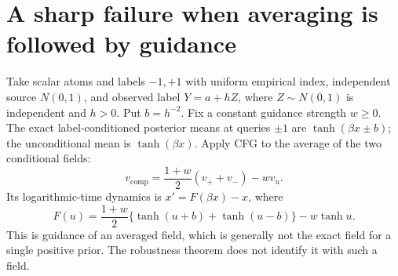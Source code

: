 \documentclass[11pt]{article}
\begin{document}
\section{A sharp failure when averaging is followed by guidance}
Take scalar atoms and labels $-1,+1$ with uniform empirical index, independent
source $N(0,1)$, and observed label $Y=a+hZ$, where $Z\sim N(0,1)$ is
independent and $h>0$. Put $b=h^{-2}$.
Fix a constant guidance strength $w\ge0$.
The exact label-conditioned posterior means at queries $\pm1$ are
$\tanh(\beta x\pm b)$; the unconditional mean is $\tanh(\beta x)$.
Apply CFG to the average of the two conditional fields:
\[
 v_{\mathrm{comp}}=\frac{1+w}{2}(v_++v_-)-wv_u.
\]
Its logarithmic-time dynamics is $x'=F(\beta x)-x$, where
\begin{equation}\label{eq:F}
 F(u)=\frac{1+w}{2}\{\tanh(u+b)+\tanh(u-b)\}-w\tanh u.
\end{equation}
This is guidance of an averaged field, which is generally not the exact field
for a single positive prior. The robustness theorem does not identify it with
such a field.
\end{document}
